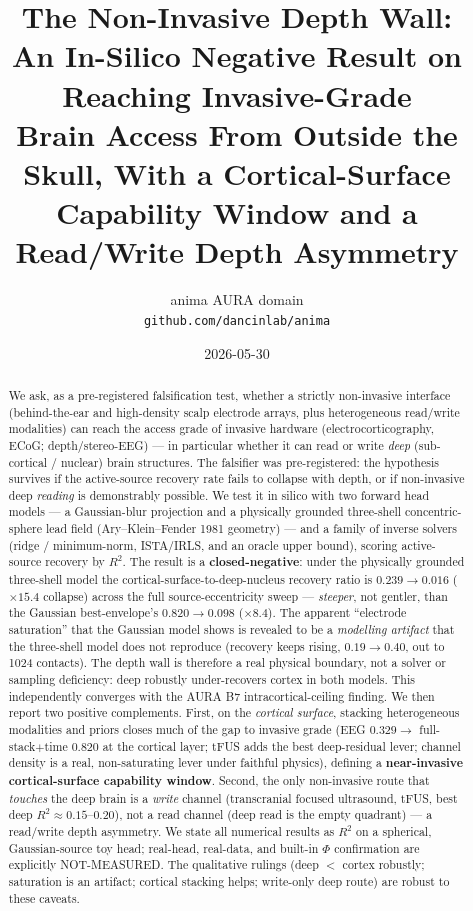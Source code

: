 \documentclass[11pt]{article}
\title{\textbf{The Non-Invasive Depth Wall:\\
An In-Silico Negative Result on Reaching Invasive-Grade\\
Brain Access From Outside the Skull, With a Cortical-Surface\\
Capability Window and a Read/Write Depth Asymmetry}}
\author{anima AURA domain \\ \texttt{github.com/dancinlab/anima}}
\date{2026-05-30}
\newcommand{\Rsq}{R^{2}}
\newcommand{\redbox}[1]{\textcolor{red!70!black}{\textbf{#1}}}
\newcommand{\greenbox}[1]{\textcolor{green!45!black}{\textbf{#1}}}
\begin{document}
\maketitle

\begin{abstract}
We ask, as a pre-registered falsification test, whether a strictly non-invasive
interface (behind-the-ear and high-density scalp electrode arrays, plus
heterogeneous read/write modalities) can reach the access grade of invasive
hardware (electrocorticography, ECoG; depth/stereo-EEG) --- in particular whether
it can read or write \emph{deep} (sub-cortical / nuclear) brain structures. The
falsifier was pre-registered: the hypothesis survives if the active-source recovery
rate fails to collapse with depth, or if non-invasive deep \emph{reading} is
demonstrably possible. We test it in silico with two forward head models --- a
Gaussian-blur projection and a physically grounded three-shell concentric-sphere
lead field (Ary--Klein--Fender 1981 geometry) --- and a family of inverse solvers
(ridge / minimum-norm, ISTA/IRLS, and an oracle upper bound), scoring active-source
recovery by $\Rsq$. The result is a \redbox{closed-negative}: under the physically
grounded three-shell model the cortical-surface-to-deep-nucleus recovery ratio is
$0.239 \rightarrow 0.016$ ($\times 15.4$ collapse) across the full source-eccentricity
sweep --- \emph{steeper}, not gentler, than the Gaussian best-envelope's
$0.820 \rightarrow 0.098$ ($\times 8.4$). The apparent ``electrode saturation'' that
the Gaussian model shows is revealed to be a \emph{modelling artifact} that the
three-shell model does not reproduce (recovery keeps rising, $0.19 \rightarrow 0.40$,
out to 1024 contacts). The depth wall is therefore a real physical boundary, not a
solver or sampling deficiency: deep robustly under-recovers cortex in both models.
This independently converges with the AURA B7 intracortical-ceiling finding. We then
report two positive complements. First, on the \emph{cortical surface}, stacking
heterogeneous modalities and priors closes much of the gap to invasive grade
(EEG $0.329 \rightarrow$ full-stack$+$time $0.820$ at the cortical layer; tFUS adds
the best deep-residual lever; channel density is a real, non-saturating lever under
faithful physics), defining a \greenbox{near-invasive cortical-surface capability
window}. Second, the only non-invasive route that \emph{touches} the deep brain is a
\emph{write} channel (transcranial focused ultrasound, tFUS, best deep $\Rsq\approx
0.15$--$0.20$), not a read channel (deep read is the empty quadrant) --- a read/write
depth asymmetry. We state all numerical results as $\Rsq$ on a spherical,
Gaussian-source toy head; real-head, real-data, and built-in $\Phi$ confirmation are
explicitly NOT-MEASURED. The qualitative rulings (deep $<$ cortex robustly;
saturation is an artifact; cortical stacking helps; write-only deep route) are robust
to these caveats.
\end{abstract}
\end{document}
